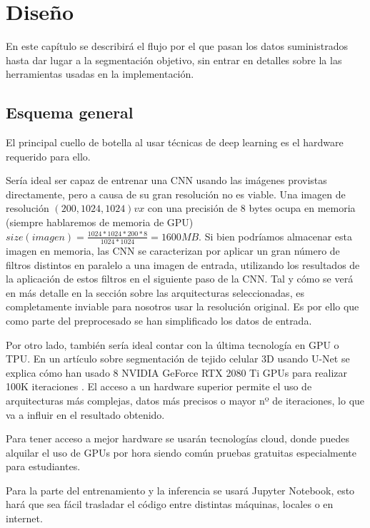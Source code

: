 \chapter{Diseño}\label{requisitos}

En este capítulo se describirá el flujo por el que pasan los datos suministrados hasta dar lugar a la segmentación objetivo, sin entrar en detalles sobre la las herramientas usadas en la implementación.

\section{Esquema general}\label{sec:diseno-general}

El principal cuello de botella al usar técnicas de deep learning es el hardware requerido para ello. 

Sería ideal ser capaz de entrenar una CNN usando las imágenes provistas directamente, pero a causa de su gran resolución no es viable. Una imagen de resolución $ (200, 1024, 1024)vx $ con una precisión de 8 bytes ocupa en memoria (siempre hablaremos de memoria de GPU) $size(imagen)=\frac{1024*1024*200*8}{1024*1024}=1600MB $. Si bien podríamos almacenar esta imagen en memoria, las CNN se caracterizan por aplicar un gran número de filtros distintos en paralelo a una imagen de entrada, utilizando los resultados de la aplicación de estos filtros en el siguiente paso de la CNN. Tal y cómo se verá en más detalle en la sección sobre las arquitecturas seleccionadas, es completamente inviable para nosotros usar la resolución original. Es por ello que como parte del preprocesado se han simplificado los datos de entrada.

Por otro lado, también sería ideal contar con la última tecnología en GPU o TPU. En un artículo sobre segmentación de tejido celular 3D usando U-Net se explica cómo han usado 8 NVIDIA GeForce RTX 2080 Ti GPUs para realizar 100K iteraciones \cite{Wolny2020}. El acceso a un hardware superior permite el uso de arquitecturas más complejas, datos más precisos o mayor nº de iteraciones, lo que va a influir en el resultado obtenido. 

Para tener acceso a mejor hardware se usarán tecnologías cloud, donde puedes alquilar el uso de GPUs por hora siendo común pruebas gratuitas especialmente para estudiantes.

Para la parte del entrenamiento y la inferencia se usará Jupyter Notebook, esto hará que sea fácil trasladar el código entre distintas máquinas, locales o en internet.

